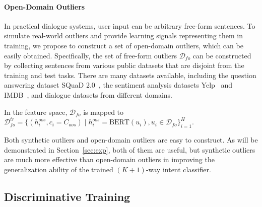 \paragraph{Open-Domain Outliers} In practical dialogue systems, user input can be arbitrary free-form sentences. To simulate real-world outliers and provide learning signals representing them in training, we propose to construct a set of open-domain outliers, which can be easily obtained. Specifically, the set of free-form outliers $\mathcal{D}_{fo}$ can be constructed by collecting sentences from various public datasets that are disjoint from the training and test tasks. There are many datasets available, including the question answering dataset SQuaD 2.0~\citep{DBLP:conf/acl/RajpurkarJL18}, the sentiment analysis datasets Yelp~\citep{DBLP:conf/cikm/MengSZ018} and IMDB~\citep{DBLP:conf/acl/MaasDPHNP11}, and dialogue datasets from different domains. 

In the feature space, $\mathcal{D}_{fo}$ is mapped to
$\mathcal{D}_{fo}^{tr} = \{(h^{oos}_i, c_i=C_{oos})\mid h^{oos}_i=\text{BERT}(u_i), u_i \in \mathcal{D}_{fo}\}_{i=1}^H$.

Both synthetic outliers and open-domain outliers are easy to construct. As will be demonstrated in Section~\ref{sec:exp}, both of them are useful, but synthetic outliers are much more effective than open-domain outliers in improving the generalization ability of the trained $(K+1)$-way intent classifier. 



\subsection{Discriminative Training}

